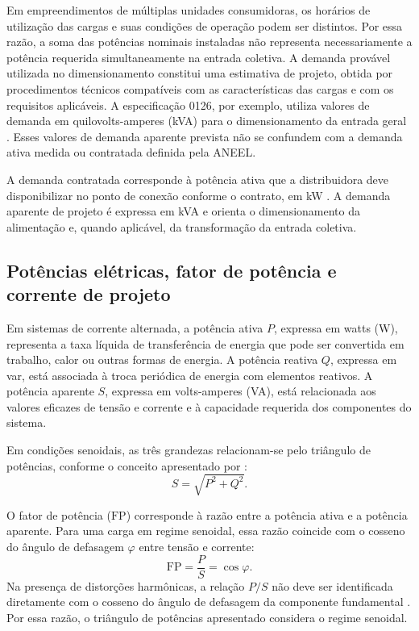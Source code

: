 Em empreendimentos de múltiplas unidades consumidoras, os horários de utilização das cargas e suas condições de operação podem ser distintos. Por essa razão, a soma das potências nominais instaladas não representa necessariamente a potência requerida simultaneamente na entrada coletiva. A demanda provável utilizada no dimensionamento constitui uma estimativa de projeto, obtida por procedimentos técnicos compatíveis com as características das cargas e com os requisitos aplicáveis. A especificação 0126, por exemplo, utiliza valores de demanda em quilovolts-amperes (kVA) para o dimensionamento da entrada geral \cite[item~7.11.2]{enel0126}. Esses valores de demanda aparente prevista não se confundem com a demanda ativa medida ou contratada definida pela ANEEL.

A demanda contratada corresponde à potência ativa que a distribuidora deve disponibilizar no ponto de conexão conforme o contrato, em kW \cite[art.~2º, inciso~XII]{aneel1000}. A demanda aparente de projeto é expressa em kVA e orienta o dimensionamento da alimentação e, quando aplicável, da transformação da entrada coletiva.

\subsection{Potências elétricas, fator de potência e corrente de projeto}

Em sistemas de corrente alternada, a potência ativa $P$, expressa em watts (W), representa a taxa líquida de transferência de energia que pode ser convertida em trabalho, calor ou outras formas de energia. A potência reativa $Q$, expressa em var, está associada à troca periódica de energia com elementos reativos. A potência aparente $S$, expressa em volts-amperes (VA), está relacionada aos valores eficazes de tensão e corrente e à capacidade requerida dos componentes do sistema.

Em condições senoidais, as três grandezas relacionam-se pelo triângulo de potências, conforme o conceito apresentado por :
\begin{equation}
 S = \sqrt{P^2+Q^2}.
 \label{eq:potencia-aparente}
\end{equation}

O fator de potência ($\mathrm{FP}$) corresponde à razão entre a potência ativa e a potência aparente. Para uma carga em regime senoidal, essa razão coincide com o cosseno do ângulo de defasagem $\varphi$ entre tensão e corrente:
\begin{equation}
 \mathrm{FP}=\frac{P}{S}=\cos\varphi.
 \label{eq:fator-potencia}
\end{equation}
Na presença de distorções harmônicas, a relação $P/S$ não deve ser identificada diretamente com o cosseno do ângulo de defasagem da componente fundamental \cite[seção~4.2.1]{mamede2017}. Por essa razão, o triângulo de potências apresentado considera o regime senoidal.

